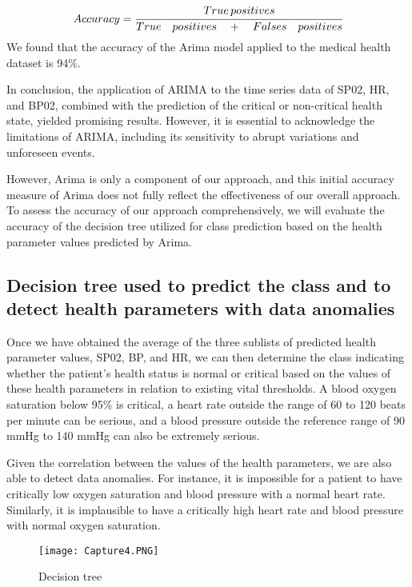 \documentclass[conference]{IEEEtran}
\begin{document}
\[
Accuracy = \cfrac{{True \, positives}}{True \quad positives \quad + \quad Falses \quad positives}
\]
\vspace{3pt}
We found that the accuracy of the Arima model applied to the medical health dataset is 94\%.

In conclusion, the application of ARIMA to the time series data of SP02, HR, and BP02, combined with the prediction of the critical or non-critical health state, yielded promising results. However, it is essential to acknowledge the limitations of ARIMA, including its sensitivity to abrupt variations and unforeseen events. 

However, Arima is only a component of our approach, and this initial accuracy measure of Arima does not fully reflect the effectiveness of our overall approach. To assess the accuracy of our approach comprehensively, we will evaluate the accuracy of the decision tree utilized for class prediction based on the health parameter values predicted by Arima.



\subsection{Decision tree used to predict the class and  to detect health parameters with data anomalies}


Once we have obtained the average of the three sublists of predicted health parameter values, SP02, BP, and HR, we can then determine the class indicating whether the patient's health status is normal or critical based on the values of these health parameters in relation to existing vital thresholds. A blood oxygen saturation below 95\% is critical, a heart rate outside the range of 60 to 120 beats per minute can be serious, and a blood pressure outside the reference range of 90 mmHg to 140 mmHg can also be extremely serious.

Given the correlation between the values of the health parameters, we are also able to detect data anomalies. For instance, it is impossible for a patient to have critically low oxygen saturation and blood pressure with a normal heart rate. Similarly, it is implausible to have a critically high heart rate and blood pressure with normal oxygen saturation.

\begin{figure}[htbp]
    \centering
    \texttt{[image: Capture4.PNG]}
    \caption{Decision tree}
    \label{fig:my_label}
\end{figure}
\end{document}
